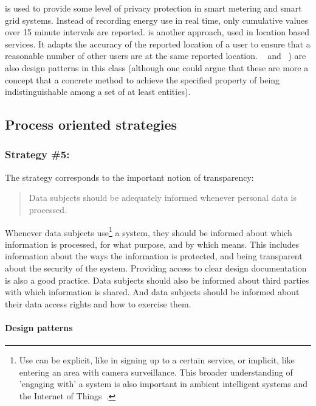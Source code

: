 is used to provide some level of privacy protection in smart metering and smart grid systems. Instead of recording  energy use in real time, only cumulative values over 15 minute intervals are reported.
 is another approach, used in location based services. It adapts the accuracy of the reported location of a user to ensure that a reasonable number of other users are at the same reported location.
~\cite{DBLP:journals/ijufks/Sweene02} and  ~\cite{DBLP:journals/tkdd/MachanavajjhalaKGV07}) are also design patterns in this class (although one could argue that these are more a concept that a concrete method to achieve the specified property of being indistinguishable among a set of at least  entities).

\subsection{Process oriented strategies}

\subsubsection{Strategy \#5: }

The  strategy corresponds to the important notion of transparency:
\begin{quote}
Data subjects should be adequately informed whenever personal data is processed.
\end{quote}
Whenever data subjects use\footnote{Use can be explicit, like in signing up to a certain service, or implicit,
  like entering an area with camera surveillance. This broader understanding
  of 'engaging with' a system is also important in ambient intelligent systems 
  and the Internet of Things~\cite{hoepman2011iot-trust}.
} 
a system, they should be informed about which information is processed, for what purpose, and by which means. This includes information about the ways the information is protected, and being transparent about the security of the system. Providing access to clear design documentation is also a good practice. Data subjects should also be informed about third parties with which information is shared. And data subjects should be informed about their data access rights and how to exercise them.

\paragraph{Design patterns}

